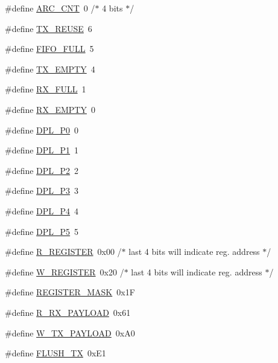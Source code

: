 \begin{DoxyCompactItemize}
\item 
\#define \hyperlink{a00013_aaae5ef9927daf8a4939cd2ed6ffff2ec}{A\-R\-C\-\_\-\-C\-N\-T}~0 /$\ast$ 4 bits $\ast$/
\item 
\#define \hyperlink{a00013_a506a58de7b75af27e3745db3e1e9733c}{T\-X\-\_\-\-R\-E\-U\-S\-E}~6
\item 
\#define \hyperlink{a00013_aff743182d3cc16bed60c67b0313cfeec}{F\-I\-F\-O\-\_\-\-F\-U\-L\-L}~5
\item 
\#define \hyperlink{a00013_ae4034d6a21b6646c8710d09e43bd9383}{T\-X\-\_\-\-E\-M\-P\-T\-Y}~4
\item 
\#define \hyperlink{a00013_a70c7df60fd47492ea236dc14c1f9e216}{R\-X\-\_\-\-F\-U\-L\-L}~1
\item 
\#define \hyperlink{a00013_a8e43dfdec50b513f49b623e9da3def46}{R\-X\-\_\-\-E\-M\-P\-T\-Y}~0
\item 
\#define \hyperlink{a00013_acf457ec76fbdc9fe3a5d3eb3e9c5dca5}{D\-P\-L\-\_\-\-P0}~0
\item 
\#define \hyperlink{a00013_aae58d2c6834305858a405abaffd95049}{D\-P\-L\-\_\-\-P1}~1
\item 
\#define \hyperlink{a00013_a444b8f6d5091149c983f6fca29775a44}{D\-P\-L\-\_\-\-P2}~2
\item 
\#define \hyperlink{a00013_ad855ab4dab05150b03716fea1fc8ddb6}{D\-P\-L\-\_\-\-P3}~3
\item 
\#define \hyperlink{a00013_a7fc41c509a5885a7199535d72f8223bf}{D\-P\-L\-\_\-\-P4}~4
\item 
\#define \hyperlink{a00013_a8907dbd1fe9dfedbaf8824dbfcfd4f65}{D\-P\-L\-\_\-\-P5}~5
\item 
\#define \hyperlink{a00013_afb0b251378d3b14c508e51fd2c3157d6}{R\-\_\-\-R\-E\-G\-I\-S\-T\-E\-R}~0x00 /$\ast$ last 4 bits will indicate reg. address $\ast$/
\item 
\#define \hyperlink{a00013_a3b68b214d5753039d2c156ad57cd7153}{W\-\_\-\-R\-E\-G\-I\-S\-T\-E\-R}~0x20 /$\ast$ last 4 bits will indicate reg. address $\ast$/
\item 
\#define \hyperlink{a00013_a866fc0cef05f3c63ba55a555f63648a2}{R\-E\-G\-I\-S\-T\-E\-R\-\_\-\-M\-A\-S\-K}~0x1\-F
\item 
\#define \hyperlink{a00013_a462d8c2314b823b724574c1ca73225a6}{R\-\_\-\-R\-X\-\_\-\-P\-A\-Y\-L\-O\-A\-D}~0x61
\item 
\#define \hyperlink{a00013_afd12673bc8ca8559b0eee395e8845982}{W\-\_\-\-T\-X\-\_\-\-P\-A\-Y\-L\-O\-A\-D}~0x\-A0
\item 
\#define \hyperlink{a00013_abce47e8066832b6ac4e18162a79859b4}{F\-L\-U\-S\-H\-\_\-\-T\-X}~0x\-E1

\end{DoxyCompactItemize}
